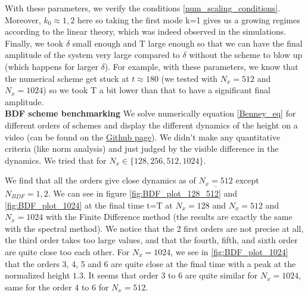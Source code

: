 \documentclass[12pt]{article}
\begin{document}
With these parameters, we verify the conditions \eqref{num_scaling_conditions}. Moreover, $k_0\approx 1,2$ here so taking the first mode k=1 gives us a growing regimes according to the linear theory, which was indeed observed in the simulations. Finally, we took $\delta$ small enough and T large enough so that we can have the final amplitude of the system very large compared to $\delta$ without the scheme to blow up (which happens for larger $\delta$). For example, with these parameters, we know that the numerical scheme get stuck at $t\approx180$ (we tested with $N_x=512$ and $N_x=1024$) so we took T a bit lower than that to have a significant final amplitude. 
\\

\textbf{BDF scheme benchmarking}
We solve numerically equation \eqref{Benney_eq} for different orders of schemes and display the different dynamics of the height on a video (can be found on the \href{https://github.com/Bilal59170/Repo_Warwick_internship}{Github page}). We didn't make any quantitative criteria (like norm analysis) and just judged by the visible difference in the dynamics. We tried that for $N_x \in \{128, 256, 512, 1024\}.$

We find that all the orders give close dynamics as of $\underline{N_x=512}$ except $N_{BDF}=1, 2$. 
We can see in figure \eqref{fig:BDF_plot_128_512}  and \eqref{fig:BDF_plot_1024} at the final time t=T at $N_x = 128$ and $N_x = 512$ and $N_x=1024$ with the Finite Difference method (the results are exactly the same with the spectral method). We notice that the 2 first orders are not precise at all, the third order takes too large values, and that the fourth, fifth, and sixth order are quite close too each other. For $N_x = 1024$, we see in \eqref{fig:BDF_plot_1024} that the orders 3, 4, 5 and 6 are quite close at the final time with a peak at the normalized height $1.3$. It seems that order 3 to 6 are quite similar for $N_x=1024$, same for the order 4 to 6 for $N_x=512.$
\end{document}
